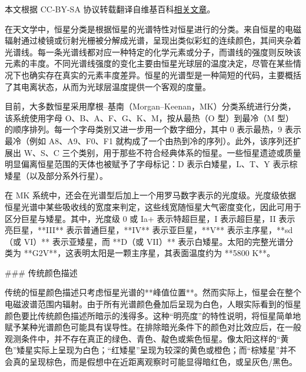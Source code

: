 
本文根据 CC-BY-SA 协议转载翻译自维基百科\href{https://en.wikipedia.org/wiki/Stellar_classification}{相关文章}。

在天文学中，恒星分类是根据恒星的光谱特性对恒星进行的分类。来自恒星的电磁辐射通过棱镜或衍射光栅被分解成光谱，呈现出类似彩虹的连续颜色，其间夹杂着光谱线。每一条光谱线都对应一种特定的化学元素或分子，而谱线的强度则反映该元素的丰度。不同光谱线强度的变化主要由恒星光球层的温度决定，尽管在某些情况下也确实存在真实的元素丰度差异。恒星的光谱型是一种简短的代码，主要概括了其电离状态，从而为光球层温度提供一个客观的度量。

目前，大多数恒星采用摩根–基南（Morgan–Keenan，MK）分类系统进行分类，该系统使用字母 O、B、A、F、G、K、M，按从最热（O 型）到最冷（M 型）的顺序排列。每一个字母类别又进一步用一个数字细分，其中 0 表示最热，9 表示最冷（例如 A8、A9、F0、F1 就构成了一个由热到冷的序列）。此外，该序列还扩展出 W、S、C 三个类别，用于那些不符合经典体系的恒星。一些恒星遗迹或质量明显偏离恒星范围的天体也被赋予了字母标记：D 表示白矮星，L、T、Y 表示棕矮星（以及部分系外行星）。

在 MK 系统中，还会在光谱型后加上一个用罗马数字表示的光度级。光度级依据恒星光谱中某些吸收线的宽度来判定，这些线宽随恒星大气密度变化，因此可用于区分巨星与矮星。其中，光度级 0 或 Ia+ 表示特超巨星，I 表示超巨星，II 表示亮巨星，**III** 表示普通巨星，**IV** 表示亚巨星，**V** 表示主序星，**sd（或 VI）** 表示亚矮星，而 **D（或 VII）** 表示白矮星。太阳的完整光谱分类为 **G2V**，这表明太阳是一颗主序星，其表面温度约为 **5800 K**。

### 传统颜色描述

传统的恒星颜色描述只考虑恒星光谱的**峰值位置**。然而实际上，恒星会在整个电磁波谱范围内辐射。由于所有光谱颜色叠加后呈现为白色，人眼实际看到的恒星颜色要比传统颜色描述所暗示的浅得多。这种“明亮度”的特性说明，将恒星简单地赋予某种光谱颜色可能具有误导性。在排除暗光条件下的颜色对比效应后，在一般观测条件中，并不存在真正的绿色、青色、靛色或紫色恒星。像太阳这样的“黄色”矮星实际上呈现为白色；“红矮星”呈现为较深的黄色或橙色；而“棕矮星”并不会真的呈现棕色，而是假想中在近距离观察时可能显得暗红色，或呈灰色/黑色。
